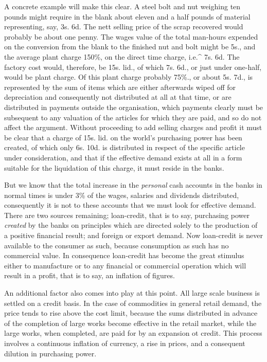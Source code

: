 \documentclass{book}
\begin{document}
A concrete example will make this clear. A steel bolt and nut weighing ten pounds might require in the blank about eleven and a half pounds of material representing, say, 3s. 6d. The nett selling price of the scrap recovered would probably be about one penny. The wages value of the total man-hours expended on the conversion from the blank to the finished nut and bolt might be 5s., and the average plant charge 150\%, on the direct time charge, i.e.\textasciicircum{} 7s. 6d. The factory cost would, therefore, be 15s. lid., of which 7s. 6d., or just under one-half, would be plant charge. Of this plant charge probably 75\%., or about 5s. 7d., is represented by the sum of items which are either afterwards wiped off for depreciation and consequently not distributed at all at that time, or are distributed in payments outside the organisation, which payments clearly must be subsequent to any valuation of the articles for which they are paid, and so do not affect the argument. Without proceeding to add selling charges and profit it must be clear that a charge of 15s. lid. on the world’s purchasing power has been created, of which only 6s. 10d. is distributed in respect of the specific article under consideration, and that if the effective demand exists at all in a form suitable for the liquidation of this charge, it must reside in the banks.

But we know that the total increase in the \emph{personal} cash accounts in the banks in normal times is under 3\% of the wages, salaries and dividends distributed, consequently it is not to these accounts that we must look for effective demand. There are two sources remaining; loan-credit, that is to say, purchasing power \emph{created} by the banks on principles which are directed solely to the production of a positive financial result; and foreign or export demand. Now loan-credit is never available to the consumer as such, because consumption as such has no commercial value. In consequence loan-credit has become the great stimulus either to manufacture or to any financial or commercial operation which will result in a profit, that is to say, an inflation of figures.

An additional factor also comes into play at this point. All large scale business is settled on a credit basis. In the case of commodities in general retail demand, the price tends to rise above the cost limit, because the sums distributed in advance of the completion of large works become effective in the retail market, while the large works, when completed, are paid for by an expansion ot credit. This process involves a continuous inflation of currency, a rise in prices, and a consequent dilution in purchasing power.
\end{document}
